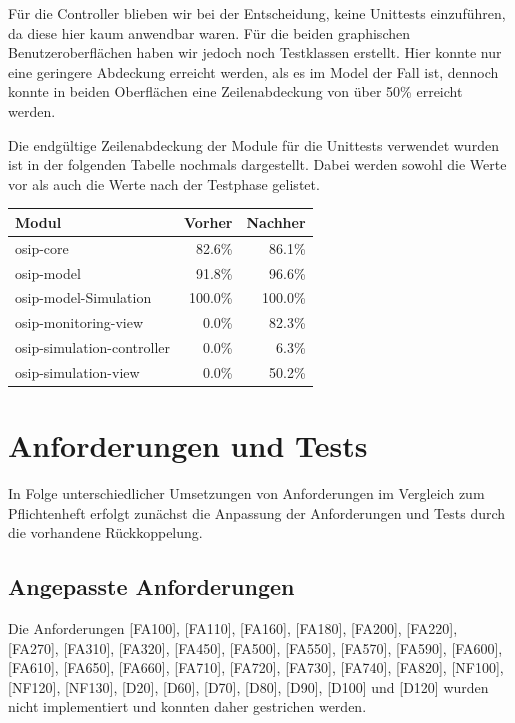 \documentclass[parskip=full]{scrartcl}
\begin{document}
Für die Controller blieben wir bei der Entscheidung, keine Unittests einzuführen, da diese hier kaum anwendbar waren. Für die beiden graphischen Benutzeroberflächen
haben wir jedoch noch Testklassen erstellt. Hier konnte nur eine geringere Abdeckung erreicht werden, als es im Model der Fall ist, dennoch konnte in beiden
Oberflächen eine Zeilenabdeckung von über 50\% erreicht werden.

Die endgültige Zeilenabdeckung der Module für die Unittests verwendet wurden ist in der folgenden Tabelle nochmals dargestellt. Dabei werden sowohl die Werte
vor als auch die Werte nach der Testphase gelistet.

\begin{tabular} {| l || r | r |}
  \hline
  Modul				& Vorher	& Nachher	\\
  \hline \hline
  osip-core			& 82.6\%	& 86.1\%	\\
  osip-model			& 91.8\%	& 96.6\%	\\
  osip-model-Simulation		& 100.0\%	& 100.0\%	\\
  osip-monitoring-view		& 0.0\%		& 82.3\%	\\
  osip-simulation-controller	& 0.0\%		& 6.3\%		\\
  osip-simulation-view		& 0.0\%		& 50.2\%	\\
  \hline
\end{tabular}

\section{Anforderungen und Tests}
In Folge unterschiedlicher Umsetzungen von Anforderungen im Vergleich zum Pflichtenheft erfolgt zunächst die Anpassung der Anforderungen und Tests durch die vorhandene Rückkoppelung.

\subsection{Angepasste Anforderungen}
Die Anforderungen [FA100], [FA110], [FA160], [FA180], [FA200], [FA220], [FA270], [FA310], [FA320], [FA450], [FA500], [FA550], [FA570], [FA590], [FA600], [FA610], [FA650], [FA660], [FA710], [FA720], [FA730], [FA740], [FA820], [NF100], [NF120], [NF130], [D20], [D60], [D70], [D80], [D90], [D100] und [D120] wurden nicht implementiert und konnten daher gestrichen werden.
\end{document}
